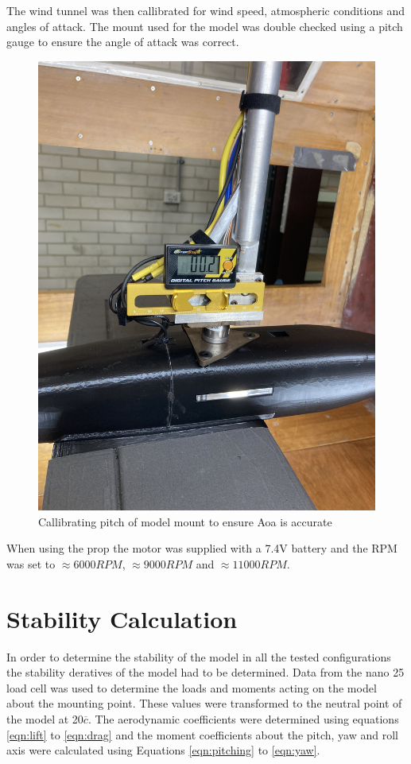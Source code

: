 The wind tunnel was then callibrated for wind speed, atmospheric conditions and angles of attack. The mount used for the model was double checked using a pitch gauge to ensure the angle of attack was correct. 
\begin{figure}
    \centering
    \includegraphics{04_Methodology/Figs/pitchGauge.jpg}
    \caption{Callibrating pitch of model mount to ensure Aoa is accurate}
    \label{fig:pitchGauge}
\end{figure}

When using the prop the motor was supplied with a 7.4V battery and the RPM was set to $\approx 6000 RPM$, $\approx 9000RPM$ and $\approx 11000 RPM$. 






\section{Stability Calculation}
In order to determine the stability of the model in all the tested configurations the stability deratives of the model had to be determined. Data from the nano 25 load cell was used to determine the loads and moments acting on the model about the mounting point. These values were transformed  to the neutral point of the model at 20$\overline{c}$. The aerodynamic coefficients were determined using equations \ref{eqn:lift} to \ref{eqn:drag} and the moment coefficients about the pitch, yaw and roll axis were calculated using Equations \ref{eqn:pitching} to \ref{eqn:yaw}. 





